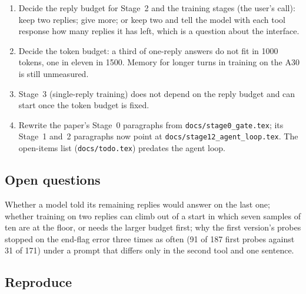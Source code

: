 \documentclass[11pt,a4paper]{article}
\begin{document}
\begin{enumerate}[nosep]
\item Decide the reply budget for Stage~2 and the training stages (the
  user's call): keep two replies; give more; or keep two and tell the model
  with each tool response how many replies it has left, which is a question
  about the interface.
\item Decide the token budget: a third of one-reply answers do not fit in
  1000 tokens, one in eleven in 1500. Memory for longer turns in training
  on the A30 is still unmeasured.
\item Stage~3 (single-reply training) does not depend on the reply budget
  and can start once the token budget is fixed.
\item Rewrite the paper's Stage~0 paragraphs from
  \texttt{docs/stage0\_gate.tex}; its Stage~1 and~2 paragraphs now point at
  \texttt{docs/stage12\_agent\_loop.tex}. The open-items list
  (\texttt{docs/todo.tex}) predates the agent loop.
\end{enumerate}

\subsection*{Open questions}

Whether a model told its remaining replies would answer on the last one;
whether training on two replies can climb out of a start in which seven
samples of ten are at the floor, or needs the larger budget first; why the
first version's probes stopped on the end-flag error three times as often
(91 of 187 first probes against 31 of 171) under a prompt that differs only
in the second tool and one sentence.

\subsection*{Reproduce}
\end{document}

